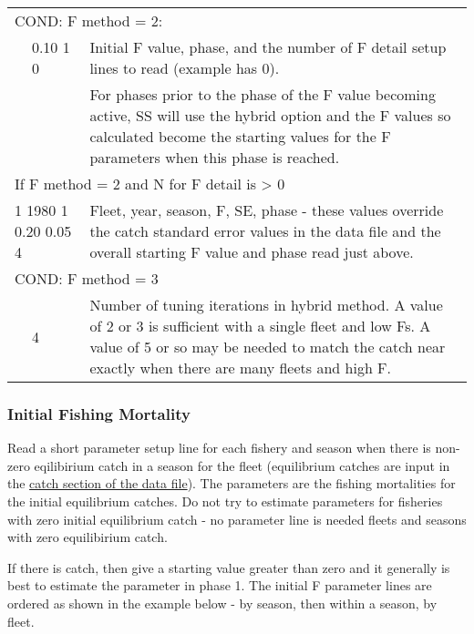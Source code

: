 \begin{longtable}{p{1cm} p{3cm} p{11cm}}
   \multicolumn{3}{l}{COND: F method = 2: }\Tstrut\\
   & 0.10  1  0 & Initial F value, phase, and the number of F detail setup lines to read (example has 0). \\
   &  & For phases prior to the phase of the F value becoming active,  SS will use the hybrid option and the F values so calculated become the starting values for the F parameters when this phase is reached.\\		   
   \multicolumn{3}{l}{If F method = 2 and N for F detail is > 0}\Tstrut\\
   \multicolumn{2}{l}{1 1980 1 0.20 0.05 4} & Fleet, year, season, F, SE, phase - these values override the catch standard error values in the data file and the overall starting F value and phase read just above.\Bstrut\\
   \hline

   \multicolumn{3}{l}{COND: F method = 3}\Tstrut\\
   & 4 & Number of tuning iterations in hybrid method. A value of 2 or 3 is sufficient with a single fleet and low Fs.  A value of 5 or so may be needed to match the catch near exactly when there are many fleets and high F. \Bstrut\\
   \hline
\end{longtable}

\hypertarget{InitF}{}
\subsubsection{Initial Fishing Mortality}
Read a short parameter setup line for each fishery and season when there is non-zero eqilibirium catch in a season for the fleet (equilibrium catches are input in the \hyperlink{CatchFormat}{catch section of the data file}). The parameters are the fishing mortalities for the initial equilibrium catches. Do not try to estimate parameters for fisheries with zero initial equilibrium catch - no parameter line is needed fleets and seasons with zero equilibirium catch.

If there is catch, then give a starting value greater than zero and it generally is best to estimate the parameter in phase 1. The initial F parameter lines are ordered as shown in the example below - by season, then within a season, by fleet.

